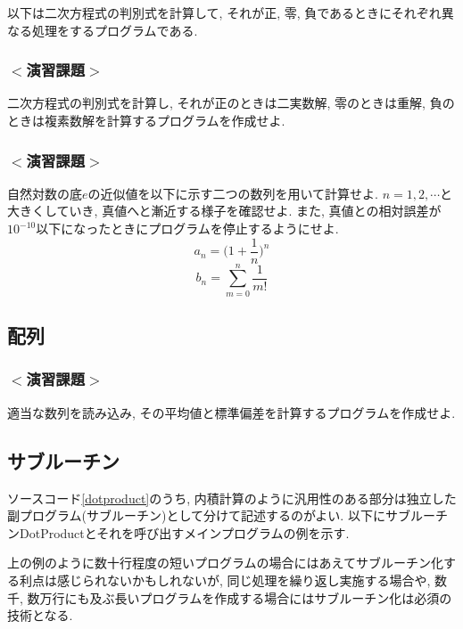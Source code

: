 \documentclass[a4j]{jsarticle}
\begin{document}
以下は二次方程式の判別式を計算して, それが正, 零, 負であるときにそれぞれ異なる処理をするプログラムである. 


\subsubsection*{$<$演習課題$>$}
二次方程式の判別式を計算し, それが正のときは二実数解, 
零のときは重解, 負のときは複素数解を計算するプログラムを作成せよ. 

\subsubsection*{$<$演習課題$>$}
自然対数の底$e$の近似値を以下に示す二つの数列を用いて計算せよ. 
$n=1, 2, \cdots$と大きくしていき, 真値へと漸近する様子を確認せよ.
また, 真値との相対誤差が$10^{-10}$以下になったときにプログラムを停止するようにせよ. 
\begin{equation}
a_n= \Big( 1+\frac{1}{n}\Big)^n
\end{equation}
\begin{equation}
b_n=\sum_{m=0}^{n}\frac{1}{m!}
\end{equation}



\subsection{配列}




\subsubsection*{$<$演習課題$>$}
適当な数列を読み込み, その平均値と標準偏差を計算するプログラムを作成せよ. 

\subsection{サブルーチン}
ソースコード\ref{dotproduct}のうち, 
内積計算のように汎用性のある部分は独立した副プログラム(サブルーチン)として分けて記述するのがよい. 
以下にサブルーチンDotProductとそれを呼び出すメインプログラムの例を示す. 

上の例のように数十行程度の短いプログラムの場合にはあえてサブルーチン化する利点は感じられないかもしれないが, 
同じ処理を繰り返し実施する場合や, 
数千, 数万行にも及ぶ長いプログラムを作成する場合にはサブルーチン化は必須の技術となる. 
\end{document}
